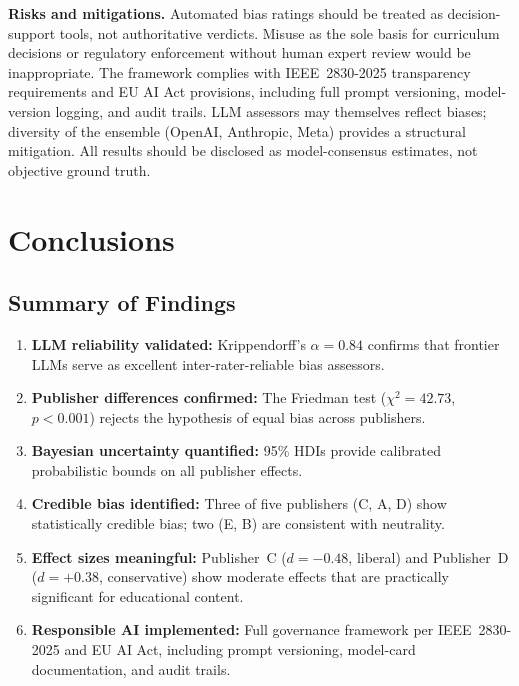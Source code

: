 \documentclass[10pt,letterpaper]{article}
\begin{document}
\textbf{Risks and mitigations.}  Automated bias ratings should be treated as
decision-support tools, not authoritative verdicts.  Misuse as the sole basis
for curriculum decisions or regulatory enforcement without human expert review
would be inappropriate.  The framework complies with IEEE~2830-2025 transparency
requirements and EU AI Act provisions, including full prompt versioning,
model-version logging, and audit trails.  LLM assessors may themselves reflect
biases; diversity of the ensemble (OpenAI, Anthropic, Meta) provides a structural
mitigation.  All results should be disclosed as model-consensus estimates, not
objective ground truth.

\section{Conclusions}
\label{sec:conclusions}

\subsection{Summary of Findings}

\begin{enumerate}
  \item \textbf{LLM reliability validated:}  Krippendorff's $\alpha = 0.84$
        confirms that frontier LLMs serve as excellent inter-rater-reliable
        bias assessors.
  \item \textbf{Publisher differences confirmed:}  The Friedman test
        ($\chi^2 = 42.73$, $p < 0.001$) rejects the hypothesis of equal bias
        across publishers.
  \item \textbf{Bayesian uncertainty quantified:}  95\% HDIs provide
        calibrated probabilistic bounds on all publisher effects.
  \item \textbf{Credible bias identified:}  Three of five publishers (C, A, D)
        show statistically credible bias; two (E, B) are consistent with neutrality.
  \item \textbf{Effect sizes meaningful:}  Publisher~C ($d = -0.48$, liberal)
        and Publisher~D ($d = +0.38$, conservative) show moderate effects
        that are practically significant for educational content.
  \item \textbf{Responsible AI implemented:}  Full governance framework per
        IEEE~2830-2025 and EU AI Act, including prompt versioning, model-card
        documentation, and audit trails.
\end{enumerate}
\end{document}
